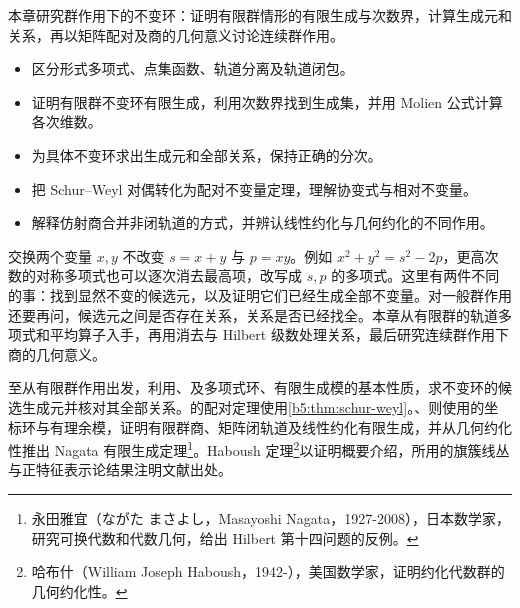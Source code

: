 

\begin{chapterabstract}
	本章研究群作用下的不变环：证明有限群情形的有限生成与次数界，计算生成元和关系，再以矩阵配对及商的几何意义讨论连续群作用。
\end{chapterabstract}

\begin{learninggoals}
	\begin{itemize}
		\item 区分形式多项式、点集函数、轨道分离及轨道闭包。
		\item 证明有限群不变环有限生成，利用次数界找到生成集，并用 Molien 公式计算各次维数。
		\item 为具体不变环求出生成元和全部关系，保持正确的分次。
		\item 把 Schur--Weyl 对偶转化为配对不变量定理，理解协变式与相对不变量。
		\item 解释仿射商合并非闭轨道的方式，并辨认线性约化与几何约化的不同作用。
	\end{itemize}
\end{learninggoals}

交换两个变量 \(x,y\) 不改变 \(s=x+y\) 与 \(p=xy\)。例如 \(x^2+y^2=s^2-2p\)，更高次数的对称多项式也可以逐次消去最高项，改写成 \(s,p\) 的多项式。这里有两件不同的事：找到显然不变的候选元，以及证明它们已经生成全部不变量。对一般群作用还要再问，候选元之间是否存在关系，关系是否已经找全。本章从有限群的轨道多项式和平均算子入手，再用消去与 Hilbert 级数处理关系，最后研究连续群作用下商的几何意义。

\ProseParagraphBreak
{}至从有限群作用出发，利用、及多项式环、有限生成模的基本性质，求不变环的候选生成元并核对其全部关系。的配对定理使用\cref{b5:thm:schur-weyl}。、则使用的坐标环与有理余模，证明有限群商、矩阵闭轨道及线性约化有限生成，并从几何约化性推出 Nagata 有限生成定理\footnote{永田雅宜（ながた まさよし，Masayoshi Nagata，1927-2008），日本数学家，研究可换代数和代数几何，给出 Hilbert 第十四问题的反例。}。Haboush 定理\footnote{哈布什（William Joseph Haboush，1942-），美国数学家，证明约化代数群的几何约化性。}以证明概要介绍，所用的旗簇线丛与正特征表示论结果注明文献出处。

